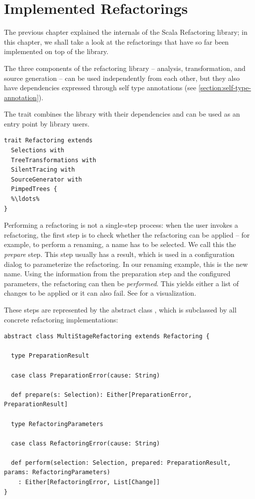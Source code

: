 \documentclass[10pt,a4paper,oneside]{scrreprt}
\begin{document}
\chapter{Implemented Refactorings} \label{chapter:implemented-refactorings}

The previous chapter explained the internals of the Scala Refactoring library; in this chapter, we shall take a look at the refactorings that have so far been implemented on top of the library. 

The three components of the refactoring library -- analysis, transformation, and source generation -- can be used independently from each other, but they also have dependencies expressed through self type annotations (see \vref{section:self-type-annotation}). 

The  trait combines the library with their dependencies and can be used as an entry point by library users.

\begin{lstlisting}
trait Refactoring extends 
  Selections with 
  TreeTransformations with 
  SilentTracing with 
  SourceGenerator with 
  PimpedTrees {
  %\ldots%
}
\end{lstlisting}

Performing a refactoring is not a single-step process: when the user invokes a refactoring, the first step is to check whether the refactoring can be applied -- for example, to perform a renaming, a name has to be selected. We call this the \textit{prepare} step. This step usually has a result, which is used in a configuration dialog to parameterize the refactoring. In our renaming example, this is the new name. Using the information from the preparation step and the configured parameters, the refactoring can then be \textit{performed}. This yields either a list of changes to be applied or it can also fail. See   for a visualization.

These steps are represented by the abstract class , which is subclassed by all concrete refactoring implementations:
\begin{lstlisting}
abstract class MultiStageRefactoring extends Refactoring {
  
  type PreparationResult
  
  case class PreparationError(cause: String)

  def prepare(s: Selection): Either[PreparationError, PreparationResult]

  type RefactoringParameters
  
  case class RefactoringError(cause: String)
  
  def perform(selection: Selection, prepared: PreparationResult, params: RefactoringParameters)
    : Either[RefactoringError, List[Change]]
}
\end{lstlisting}
\end{document}
